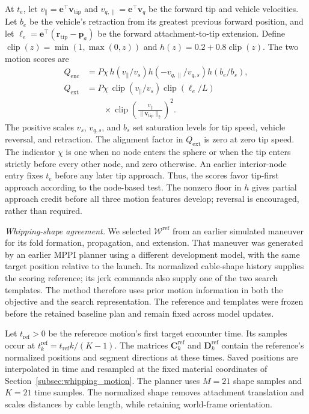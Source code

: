 \documentclass[letterpaper, 10 pt, conference]{ieeeconf}
\begin{document}
At $t_e$, let $v_\parallel=\mathbf e^\top\mathbf v_{\mathrm{tip}}$
and $v_{q,\parallel}=\mathbf e^\top\mathbf v_q$ be the forward
tip and vehicle velocities. Let $b_e$ be the vehicle's retraction
from its greatest previous forward position, and let
$\ell_e=\mathbf e^\top(\mathbf r_{\mathrm{tip}}-\mathbf p_a)$
be the forward attachment-to-tip extension.
Define $\operatorname{clip}(z)=\min(1,\max(0,z))$ and
$h(z)=0.2+0.8\operatorname{clip}(z)$. The two motion scores are
\begin{equation}
\begin{aligned}
Q_{\mathrm{enc}}
&=P\chi\,h(v_\parallel/v_s)
  h(-v_{q,\parallel}/v_{q,s})h(b_e/b_s),\\
Q_{\mathrm{ext}}
&=P\chi\,\operatorname{clip}(v_\parallel/v_s)
  \operatorname{clip}(\ell_e/L)\\
&\qquad\times
  \operatorname{clip}\!\left(
  \frac{v_\parallel}{\|\mathbf v_{\mathrm{tip}}\|_2}\right)^2.
\end{aligned}
\label{eq:directed_motion_scores}
\end{equation}
The positive scales $v_s$, $v_{q,s}$, and $b_s$ set saturation
levels for tip speed, vehicle reversal, and retraction.
The alignment factor in $Q_{\mathrm{ext}}$ is zero at zero
tip speed. The indicator $\chi$ is one when no node enters
the sphere or when the tip enters strictly before every other
node, and zero otherwise. An earlier interior-node entry fixes
$t_e$ before any later tip approach. Thus, the scores favor
tip-first approach according to the node-based test.
The nonzero floor in $h$ gives partial approach credit before
all three motion features develop; reversal is encouraged,
rather than required.

\noindent\emph{Whipping-shape agreement.}
We selected $\mathcal{W}^{\mathrm{ref}}$ from an earlier simulated maneuver
for its fold formation, propagation, and extension. That maneuver
was generated by an earlier MPPI planner using a different
development model, with the same target position relative to
the launch. Its normalized cable-shape history supplies the
scoring reference; its jerk commands also supply one of the
two search templates. The method therefore uses prior motion
information in both the objective and the search representation.
The reference and templates were frozen before the retained
baseline plan and remain fixed across model updates.

Let $t_{\mathrm{ref}}>0$ be the reference motion's first target
encounter time. Its samples occur at
$t_k^{\mathrm{ref}}=t_{\mathrm{ref}}k/(K-1)$.
The matrices $\mathbf{C}_k^{\mathrm{ref}}$ and
$\mathbf{D}_k^{\mathrm{ref}}$ contain the reference's normalized
positions and segment directions at these times.
Saved positions are interpolated in time and resampled at the
fixed material coordinates of Section~\ref{subsec:whipping_motion}.
The planner uses $M=21$ shape samples and $K=21$ time samples.
The normalized shape removes attachment translation and scales
distances by cable length, while retaining world-frame orientation.
\end{document}
